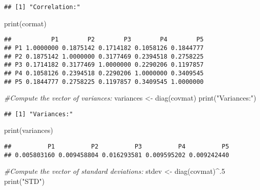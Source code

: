 \documentclass[
]{article}
\newenvironment{Shaded}{\begin{snugshade}}{\end{snugshade}}
\newcommand{\CommentTok}[1]{\textcolor[rgb]{0.56,0.35,0.01}{\textit{#1}}}
\newcommand{\DecValTok}[1]{\textcolor[rgb]{0.00,0.00,0.81}{#1}}
\newcommand{\FunctionTok}[1]{\textcolor[rgb]{0.00,0.00,0.00}{#1}}
\newcommand{\NormalTok}[1]{#1}
\newcommand{\OtherTok}[1]{\textcolor[rgb]{0.56,0.35,0.01}{#1}}
\newcommand{\SpecialCharTok}[1]{\textcolor[rgb]{0.00,0.00,0.00}{#1}}
\newcommand{\StringTok}[1]{\textcolor[rgb]{0.31,0.60,0.02}{#1}}
\begin{document}
\begin{verbatim}
## [1] "Correlation:"
\end{verbatim}

\begin{Shaded}
\begin{Highlighting}[]
\FunctionTok{print}\NormalTok{(cormat)}
\end{Highlighting}
\end{Shaded}

\begin{verbatim}
##           P1        P2        P3        P4        P5
## P1 1.0000000 0.1875142 0.1714182 0.1058126 0.1844777
## P2 0.1875142 1.0000000 0.3177469 0.2394518 0.2758225
## P3 0.1714182 0.3177469 1.0000000 0.2290206 0.1197857
## P4 0.1058126 0.2394518 0.2290206 1.0000000 0.3409545
## P5 0.1844777 0.2758225 0.1197857 0.3409545 1.0000000
\end{verbatim}

\begin{Shaded}
\begin{Highlighting}[]
\CommentTok{\#Compute the vector of variances: }
\NormalTok{variances }\OtherTok{\textless{}{-}} \FunctionTok{diag}\NormalTok{(covmat)}
\FunctionTok{print}\NormalTok{(}\StringTok{"Variances:"}\NormalTok{)}
\end{Highlighting}
\end{Shaded}

\begin{verbatim}
## [1] "Variances:"
\end{verbatim}

\begin{Shaded}
\begin{Highlighting}[]
\FunctionTok{print}\NormalTok{(variances)}
\end{Highlighting}
\end{Shaded}

\begin{verbatim}
##          P1          P2          P3          P4          P5 
## 0.005803160 0.009458804 0.016293581 0.009595202 0.009242440
\end{verbatim}

\begin{Shaded}
\begin{Highlighting}[]
\CommentTok{\#Compute the vector of standard deviations: }
\NormalTok{stdev }\OtherTok{\textless{}{-}} \FunctionTok{diag}\NormalTok{(covmat)}\SpecialCharTok{\^{}}\NormalTok{.}\DecValTok{5}
\FunctionTok{print}\NormalTok{(}\StringTok{"STD"}\NormalTok{)}
\end{Highlighting}
\end{Shaded}
\end{document}
